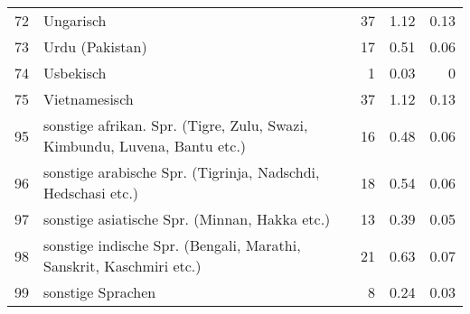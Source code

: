\begin{longtable}{lXrrr}
        72 & \multicolumn{1}{X}{Ungarisch} & %
          \num{37} &
          \num[round-mode=places,round-precision=2]{1.12} &
          \num[round-mode=places,round-precision=2]{0.13} \\

        73 & \multicolumn{1}{X}{Urdu (Pakistan)} & %
          \num{17} &
          \num[round-mode=places,round-precision=2]{0.51} &
          \num[round-mode=places,round-precision=2]{0.06} \\

        74 & \multicolumn{1}{X}{Usbekisch} & %
          \num{1} &
          \num[round-mode=places,round-precision=2]{0.03} &
          \num[round-mode=places,round-precision=2]{0} \\

        75 & \multicolumn{1}{X}{Vietnamesisch} & %
          \num{37} &
          \num[round-mode=places,round-precision=2]{1.12} &
          \num[round-mode=places,round-precision=2]{0.13} \\

        95 & \multicolumn{1}{X}{sonstige afrikan. Spr. (Tigre, Zulu, Swazi, Kimbundu, Luvena, Bantu etc.)} & %
          \num{16} &
          \num[round-mode=places,round-precision=2]{0.48} &
          \num[round-mode=places,round-precision=2]{0.06} \\

        96 & \multicolumn{1}{X}{sonstige arabische Spr. (Tigrinja, Nadschdi, Hedschasi etc.)} & %
          \num{18} &
          \num[round-mode=places,round-precision=2]{0.54} &
          \num[round-mode=places,round-precision=2]{0.06} \\

        97 & \multicolumn{1}{X}{sonstige asiatische Spr. (Minnan, Hakka etc.)} & %
          \num{13} &
          \num[round-mode=places,round-precision=2]{0.39} &
          \num[round-mode=places,round-precision=2]{0.05} \\

        98 & \multicolumn{1}{X}{sonstige indische Spr. (Bengali, Marathi, Sanskrit, Kaschmiri etc.)} & %
          \num{21} &
          \num[round-mode=places,round-precision=2]{0.63} &
          \num[round-mode=places,round-precision=2]{0.07} \\

        99 & \multicolumn{1}{X}{sonstige Sprachen} & %
          \num{8} &
          \num[round-mode=places,round-precision=2]{0.24} &
          \num[round-mode=places,round-precision=2]{0.03} \\


\end{longtable}
